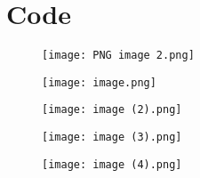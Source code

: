 \documentclass{article}
\begin{document}
\section*{Code}


\begin{figure}
    \centering
    \texttt{[image: PNG image 2.png]}
    \label{fig:enter-label}
\end{figure}
\begin{figure}
    \centering
    \texttt{[image: image.png]}
    
    \label{fig:enter-label}
\end{figure}
\begin{figure}
    \centering
    \texttt{[image: image (2).png]}
    \label{fig:enter-label}
\end{figure}
\begin{figure}
    \centering
    \texttt{[image: image (3).png]}
    \label{fig:enter-label}
\end{figure}
\begin{figure}
    \centering
    \texttt{[image: image (4).png]}
    
    \label{fig:enter-label}
\end{figure}
\end{document}
